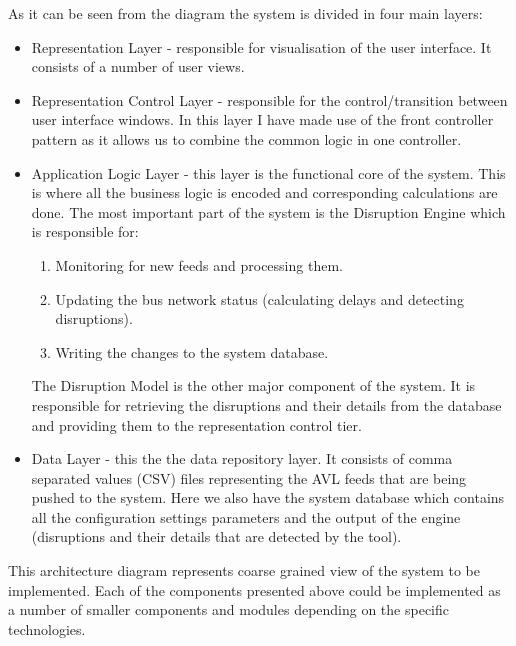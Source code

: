 As it can be seen from the diagram the system is divided in four main layers:
\begin{itemize}
	\item Representation Layer - responsible for visualisation of the user interface. It consists of a number of user views.
	\item Representation  Control Layer - responsible for the control/transition between user interface windows. In this layer I have made use of the front controller pattern \cite{fowler2003patterns} as it allows us to combine the common logic in one controller.
	\item Application Logic Layer -  this layer is the functional core of the system. This is where all the business logic is encoded and corresponding calculations are done. The most important part of the system is the Disruption Engine which is responsible for:
	\begin{enumerate}
		\item Monitoring for new feeds and processing them.
		\item Updating the bus network status (calculating delays and detecting disruptions).
		\item Writing the changes to the system database.
	\end{enumerate}
	The Disruption Model is the other major component of the system. It is responsible for retrieving the disruptions and their details from the database and providing them to the representation control tier.
	\item Data Layer - this the the data repository layer. It consists of comma separated values (CSV) files representing the AVL feeds that are being pushed to the system. Here we also have the system database which contains all the configuration settings parameters and the output of the engine (disruptions and their details that are detected by the tool).
\end{itemize}
This architecture diagram represents coarse grained view of the system to be implemented. Each of the components presented above could be implemented as a number of smaller components and modules depending on the specific technologies.

